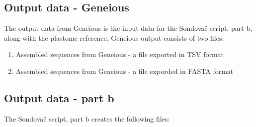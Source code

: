 \subsection{Output data - Geneious}

The output data from Geneious is the input data for the Sondovač script, part b, along with the plastome reference. 
Geneious output consists of two files: 
\begin{enumerate}
\item Assembled sequences from Geneious - a file exported in TSV format
\item Assembled sequences from Geneious - a file exporded in FASTA format
\end{enumerate}

\subsection{Output data - part b}

The Sondovač script, part b creates the following files: 

